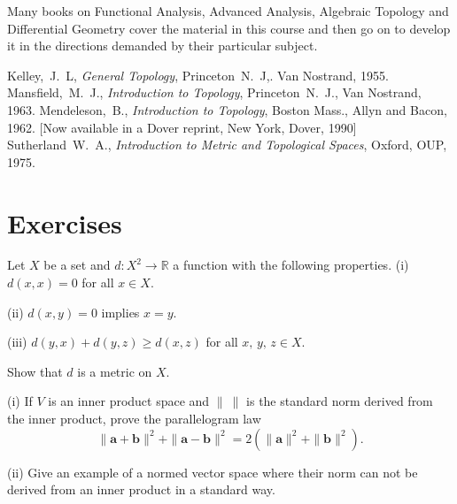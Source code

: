Many books on Functional Analysis, Advanced Analysis, Algebraic
Topology and Differential Geometry cover the material in this
course and then go on to develop it in the directions demanded
by their particular subject.
\begin{thebibliography}{9}
 Kelley,~J.~L, \emph{General Topology}, Princeton~N.~J,.
Van Nostrand, 1955.
 Mansfield,~M.~J.,
\emph{Introduction to Topology},  Princeton~N.~J.,
Van Nostrand, 1963.
 Mendeleson,~B., \emph{Introduction to Topology},
Boston Mass., Allyn and Bacon, 1962. [Now available in
a Dover reprint, New York, Dover, 1990]
 Sutherland~W.~A., 
\emph{Introduction to Metric and Topological Spaces}, Oxford,
OUP, 1975.
\end{thebibliography}
\section{Exercises}
\begin{exercise}\label{E;axiom grubbing}
Let $X$ be a set and
$d:X^{2}\rightarrow{\mathbb R}$ a function with the
following properties.
\ben
(i) $d(x,x)=0$ for all $x\in X$.
                                                                               
(ii) $d(x,y)=0$ implies $x=y$.
                                                                               
(iii) $d(y,x)+d(y,z)\geq d(x,z)$ for all $x,\,y,\,z\in X$.
\een

\noindent Show that $d$ is a metric on $X$.
\end{exercise}
\begin{exercise}\label{E;parallelogram} (i) If $V$ is an inner product
space and $\|\ \|$ is the standard norm derived from the inner product,
prove the parallelogram law
\[\|{\mathbf a}+{\mathbf b}\|^{2}+\|{\mathbf a}-{\mathbf b}\|^{2}
=2(\|{\mathbf a}\|^{2}+\|{\mathbf b}\|^{2}).\]

(ii) Give an example of a normed vector space where
their norm can not be derived from an inner product
in a standard way.
\end{exercise} 
